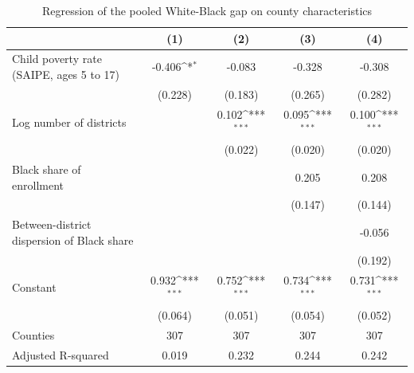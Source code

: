 \begin{table}[htbp]\centering
\def\sym#1{\ifmmode^{#1}\else\(^{#1}\)\fi}
\caption{Regression of the pooled White-Black gap on county characteristics}
\begin{tabular}{l*{4}{c}}
\toprule
                    &\multicolumn{1}{c}{(1)}&\multicolumn{1}{c}{(2)}&\multicolumn{1}{c}{(3)}&\multicolumn{1}{c}{(4)}\\
\midrule
Child poverty rate (SAIPE, ages 5 to 17)&      -0.406\sym{*}  &      -0.083         &      -0.328         &      -0.308         \\
                    &     (0.228)         &     (0.183)         &     (0.265)         &     (0.282)         \\
\addlinespace
Log number of districts&                     &       0.102\sym{***}&       0.095\sym{***}&       0.100\sym{***}\\
                    &                     &     (0.022)         &     (0.020)         &     (0.020)         \\
\addlinespace
Black share of enrollment&                     &                     &       0.205         &       0.208         \\
                    &                     &                     &     (0.147)         &     (0.144)         \\
\addlinespace
Between-district dispersion of Black share&                     &                     &                     &      -0.056         \\
                    &                     &                     &                     &     (0.192)         \\
\addlinespace
Constant            &       0.932\sym{***}&       0.752\sym{***}&       0.734\sym{***}&       0.731\sym{***}\\
                    &     (0.064)         &     (0.051)         &     (0.054)         &     (0.052)         \\
\midrule
Counties            &         307         &         307         &         307         &         307         \\
Adjusted R-squared  &       0.019         &       0.232         &       0.244         &       0.242         \\
\bottomrule
\end{tabular}
\end{table}
